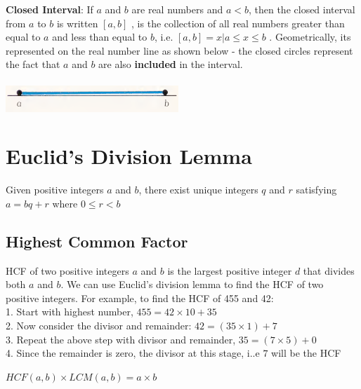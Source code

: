 \documentclass{book}
\begin{document}
	\textbf{Closed Interval}:  If $a$ and $b$ are real numbers and $a<b$,  then the closed interval from $a$ to $b$ is written $[a,b]$ , is the collection of all real numbers greater than equal to $a$ and less than equal to $b$, i.e. $[a,b] = {{x | a \leq x \leq b}}$ . Geometrically, its represented on the real number line as shown below - the closed circles represent the fact that $a$ and $b$ are also \textbf{included} in the interval. 	\\
	\\
	\includegraphics[scale=0.5]{closedinterval}
	
	\section{Euclid's Division Lemma}
	\begin{mdframed}[backgroundcolor=yellow]
		Given positive integers $a$ and $b$, there exist unique integers $q$ and $r$ satisfying $a = bq + r$ where $0 \leq r < b$
	\end{mdframed}
	
	\subsection{Highest Common Factor}
	HCF of two positive integers $a$ and $b$ is the largest positive integer $d$ that divides both $a$ and $b$. We can use Euclid’s division lemma to find the HCF of two positive integers. For example, to find the HCF of 455 and 42: \\
	1. Start with highest number, $455 = 42 \times 10 + 35$ \\
	2. Now consider the divisor and remainder: $42 = (35 \times 1) + 7$ \\
	3. Repeat the above step with divisor and remainder, $35 = (7 \times 5) + 0$\\
	4. Since the remainder is zero, the divisor at this stage, i..e $7$ will be the HCF \\
	
	\begin{mdframed}[backgroundcolor=yellow]
		$HCF(a,b) \times LCM (a,b) = a \times b$
	\end{mdframed}
\end{document}
